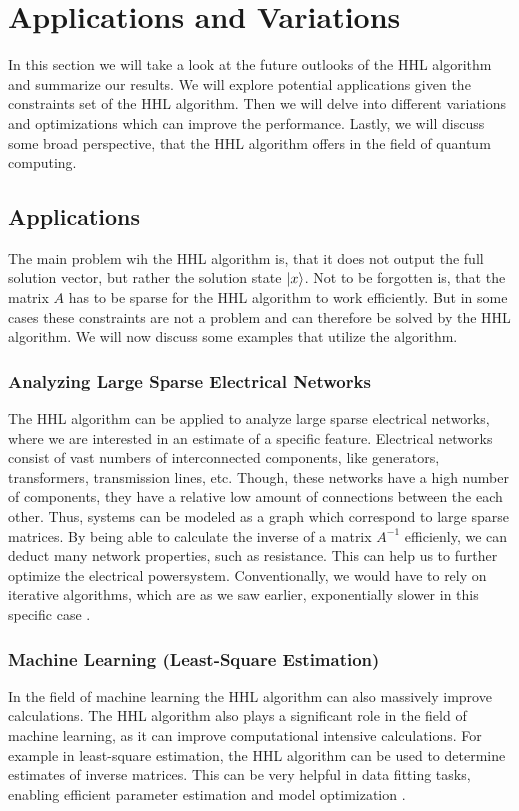 \section{Applications and Variations} 
In this section we will take a look at the future outlooks of the HHL algorithm and summarize our results.
We will explore potential applications given the constraints set of the HHL algorithm.
Then we will delve into different variations and optimizations which can improve the performance. 
Lastly, we will discuss some broad perspective, that the HHL algorithm offers in the field of quantum computing. 

\subsection{Applications}
The main problem wih the HHL algorithm is, that it does not output the full solution vector, but rather the solution state $\ket x$.
Not to be forgotten is, that the matrix $A$ has to be sparse for the HHL algorithm to work efficiently.
But in some cases these constraints are not a problem and can therefore be solved by the HHL algorithm.
We will now discuss some examples that utilize the algorithm. 

    \subsubsection{Analyzing Large Sparse Electrical Networks}
    The HHL algorithm can be applied to analyze large sparse electrical networks, where we are interested in an estimate of a specific feature.
    Electrical networks consist of vast numbers of interconnected components, like generators, transformers, transmission lines, etc. 
    Though, these networks have a high number of components, they have a relative low amount of connections between the each other.
    Thus, systems can be modeled as a graph which correspond to large sparse matrices.
    By being able to calculate the inverse of a matrix $A^{-1}$ efficienly, we can deduct many network properties, such as resistance. 
    This can help us to further optimize the electrical powersystem.
    Conventionally, we would have to rely on iterative algorithms, which are as we saw earlier, exponentially slower in this specific case \cite{electrical_networks}.
    
    \subsubsection{Machine Learning (Least-Square Estimation)}
    In the field of machine learning the HHL algorithm can also massively improve calculations. 
    The HHL algorithm also plays a significant role in the field of machine learning, as it can improve computational intensive calculations.
    For example in least-square estimation, the HHL algorithm can be used to determine estimates of inverse matrices. 
    This can be very helpful in data fitting tasks, enabling efficient parameter estimation and model optimization \cite{data_fitting}.
    
